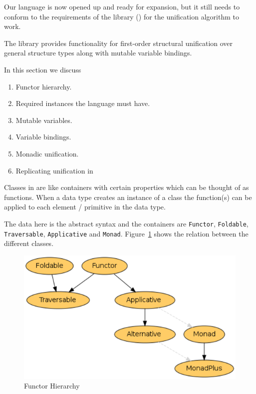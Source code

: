 \documentclass[thesis-solanki.tex]{subfiles}
\begin{document}
Our language is now opened up and ready for expansion, but it still needs to conform to the requirements of the
 library (\cite{unification-fd-lib}) for the unification algorithm to work.

The library provides functionality for first-order structural unification over general structure types along with
mutable variable bindings.

In this section we discuss
\begin{enumerate}
\item Functor hierarchy.

\item Required instances the language must have.

\item Mutable variables.

\item Variable bindings.

\item Monadic unification.

\item Replicating  unification in 
\end{enumerate}

Classes in  are like containers with certain properties which can be thought of as functions. When a data type creates an
instance of a class the function(s) can be applied to each element / primitive in the data type.


The data here is the  abstract syntax and the containers are
\Verb!Functor!, \Verb!Foldable!, \Verb!Traversable!, \Verb!Applicative!
  and
\Verb!Monad!.
Figure~\ref{fig:Functor Hierarchy} shows the relation between the different classes.

\begin{figure}[th]
\centering
\includegraphics[scale = 0.7]{FunctorHierarchy.png}
\caption{Functor Hierarchy \cite{website:foldablenadtraversable}}
\label{fig:Functor Hierarchy}
\end{figure}
\end{document}
